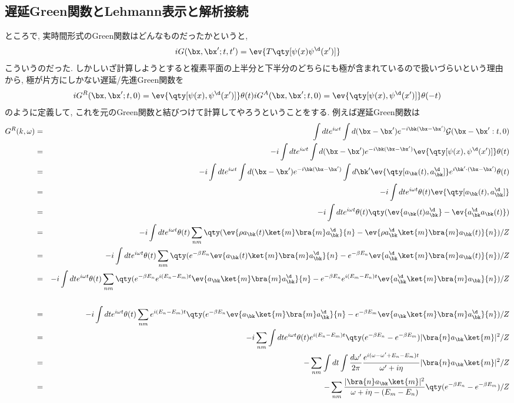 \documentclass[10.5pt,a4paper]{jreport}
\begin{document}
\subsection{遅延Green関数とLehmann表示と解析接続}
ところで, 実時間形式のGreen関数はどんなものだったかというと,
\begin{eqnarray}
  iG(\bx, \bx';t, t') = \ev{T\qty[\psi(x)\psi^\d(x')]}
\end{eqnarray}
こういうのだった. しかしいざ計算しようとすると複素平面の上半分と下半分のどちらにも極が含まれているので扱いづらいという理由から, 極が片方にしかない遅延/先進Green関数を
\begin{eqnarray}
  iG^R(\bx, \bx';t, 0) = \ev{\qty[\psi(x), \psi^\d(x')]}\theta(t)
  iG^A(\bx, \bx';t, 0) = \ev{\qty[\psi(x), \psi^\d(x')]}\theta(-t)
\end{eqnarray}
のように定義して, これを元のGreen関数と結びつけて計算してやろうということをする. 例えば遅延Green関数は
\begin{eqnarray}
  G^R(k, \omega) &=& \int dte^{i\omega t}\int d(\bx-\bx')e^{-i\bk(\bx -\bx')}{\cal G}(\bx-\bx':t, 0)\\
  &=& -i\int dte^{i\omega t}\int d(\bx-\bx')e^{-i\bk(\bx -\bx')}\ev{\qty[\psi(x), \psi^\d(x')]}\theta(t)\\
  &=& -i\int dte^{i\omega t}\int d(\bx-\bx')e^{-i\bk(\bx -\bx')}\int d\bk'\ev{\qty[a_{\bk}(t), a^\d_{\bk}]}e^{i\bk'\cdot(\bx - \bx')}\theta(t)\\
  &=& -i\int dte^{i\omega t}\theta(t)\ev{\qty[a_{\bk}(t), a^\d_{\bk}]}\\
  &=& -i\int dte^{i\omega t}\theta(t)\qty(\ev{a_{\bk}(t)a^\d_{\bk}} - \ev{a^\d_{\bk}a_{\bk}(t)})\\
  &=& -i\int dte^{i\omega t}\theta(t)\sum_{nm}\qty(\ev{\rho a_{\bk}(t)\ket{m}\bra{m}a^\d_{\bk}}{n} - \ev{\rho a^\d_{\bk}\ket{m}\bra{m} a_{\bk}(t)}{n})/Z\\
  &=& -i\int dte^{i\omega t}\theta(t)\sum_{nm}\qty(e^{-\beta E_n}\ev{a_{\bk}(t)\ket{m}\bra{m}a^\d_{\bk}}{n} - e^{-\beta E_n}\ev{a^\d_{\bk}\ket{m}\bra{m}a_{\bk}(t)}{n})/Z\\
  \nonumber  &=& -i\int dte^{i\omega t}\theta(t)\sum_{nm}\qty(e^{-\beta E_n}e^{i(E_n - E_m)t}\ev{a_{\bk}\ket{m}\bra{m}a^\d_{\bk}}{n} - e^{-\beta E_n}e^{i(E_m - E_n)t}\ev{a^\d_{\bk}\ket{m}\bra{m}a_{\bk}}{n})/Z\\
  \\
  &=& -i\int dte^{i\omega t}\theta(t)\sum_{nm}e^{i(E_n - E_m)t}\qty(e^{-\beta E_n}\ev{a_{\bk}\ket{m}\bra{m}a^\d_{\bk}}{n} - e^{-\beta E_m}\ev{a_{\bk}\ket{m}\bra{m}a^\d_{\bk}}{n})/Z\\
  &=& -i\sum_{nm}\int dte^{i\omega t}\theta(t)e^{i(E_n - E_m)t}\qty(e^{-\beta E_n} - e^{-\beta E_m})|\bra{n}a_{\bk}\ket{m}|^2/Z\\
  &=& -\sum_{nm}\int dt \int \frac{d\omega'}{2\pi}\frac{e^{i(\omega - \omega' + E_n - E_m) t}}{\omega' + i\eta}|\bra{n}a_{\bk}\ket{m}|^2/Z\\
  &=& -\sum_{nm}\frac{|\bra{n}a_{\bk}\ket{m}|^2}{\omega  + i\eta - (E_m - E_n)}\qty(e^{-\beta E_n} - e^{-\beta E_m})/Z
\end{eqnarray}
\end{document}
